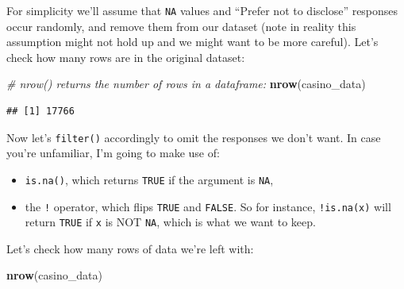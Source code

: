 \documentclass[
]{book}
\newenvironment{Shaded}{\begin{snugshade}}{\end{snugshade}}
\newcommand{\CommentTok}[1]{\textcolor[rgb]{0.56,0.35,0.01}{\textit{#1}}}
\newcommand{\KeywordTok}[1]{\textcolor[rgb]{0.13,0.29,0.53}{\textbf{#1}}}
\newcommand{\NormalTok}[1]{#1}
\newcommand{\OperatorTok}[1]{\textcolor[rgb]{0.81,0.36,0.00}{\textbf{#1}}}
\newcommand{\StringTok}[1]{\textcolor[rgb]{0.31,0.60,0.02}{#1}}
\providecommand{\tightlist}{%
  \setlength{\itemsep}{0pt}\setlength{\parskip}{0pt}}
\begin{document}
For simplicity we'll assume that \texttt{NA} values and ``Prefer not to disclose'' responses occur randomly, and remove them from our dataset (note in reality this assumption might not hold up and we might want to be more careful). Let's check how many rows are in the original dataset:

\begin{Shaded}
\begin{Highlighting}[]
\CommentTok{# nrow() returns the number of rows in a dataframe:}
\KeywordTok{nrow}\NormalTok{(casino_data)}
\end{Highlighting}
\end{Shaded}

\begin{verbatim}
## [1] 17766
\end{verbatim}

Now let's \texttt{filter()} accordingly to omit the responses we don't want. In case you're unfamiliar, I'm going to make use of:

\begin{itemize}
\tightlist
\item
  \texttt{is.na()}, which returns \texttt{TRUE} if the argument is \texttt{NA},
\item
  the \texttt{!} operator, which flips \texttt{TRUE} and \texttt{FALSE}. So for instance, \texttt{!is.na(x)} will return \texttt{TRUE} if \texttt{x} is NOT \texttt{NA}, which is what we want to keep.
\end{itemize}

\begin{Shaded}
\end{Shaded}

Let's check how many rows of data we're left with:

\begin{Shaded}
\begin{Highlighting}[]
\KeywordTok{nrow}\NormalTok{(casino_data)}
\end{Highlighting}
\end{Shaded}
\end{document}
